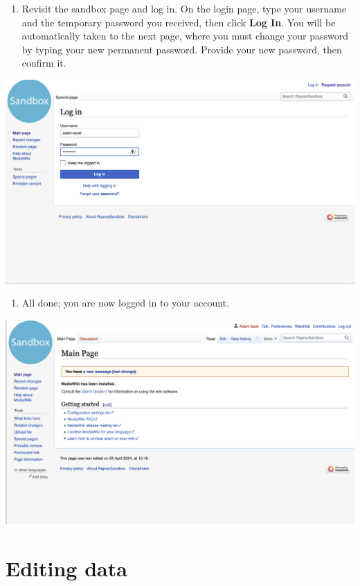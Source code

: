 \documentclass[
  letterpaper,
  DIV=11,
  numbers=noendperiod]{scrreprt}
\providecommand{\tightlist}{%
  \setlength{\itemsep}{0pt}\setlength{\parskip}{0pt}}\usepackage{longtable,booktabs,array}
\begin{document}
\begin{enumerate}
\def\labelenumi{\arabic{enumi}.}
\setcounter{enumi}{5}
\tightlist
\item
  Revisit the sandbox page and log in. On the login page, type your
  username and the temporary password you received, then click
  \textbf{Log In}. You will be automatically taken to the next page,
  where you must change your password by typing your new permanent
  password. Provide your new password, then confirm it.
\end{enumerate}

\includegraphics{png/wikibase/request-account_log-in-page.png}

\begin{enumerate}
\def\labelenumi{\arabic{enumi}.}
\setcounter{enumi}{6}
\tightlist
\item
  All done; you are now logged in to your account.
\end{enumerate}

\includegraphics{png/wikibase/request-account_logged-in.png}

\section{Editing data}\label{editing-data}
\end{document}
